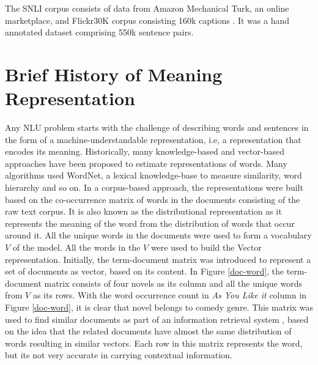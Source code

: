 \documentclass[12pt]{report} %
\begin{document}
  The SNLI corpus consists of data from Amazon Mechanical Turk, an online marketplace, and Flickr30K corpus consisting 160k captions \citep{bowman2015large}. It was a hand annotated dataset comprising 550k sentence pairs.

\section{Brief History of Meaning Representation}
\label{history}

Any NLU problem starts with the challenge of describing words and sentences in the form of a machine-understandable representation, i.e, a representation that encodes its meaning. Historically, many knowledge-based and vector-based approaches have been proposed to estimate representations of words. Many algorithms used WordNet, a lexical knowledge-base to measure similarity, word hierarchy and so on. In a corpus-based approach, the representations were built based on the co-occurrence matrix of words in the documents consisting of the raw text corpus. It is also known as the distributional representation as it represents the meaning of the word from the distribution of words that occur around it. All the unique words in the documents were used to form a vocabulary $V$ of the model. All the words in the $V$ were used to build the Vector representation. Initially, the term-document matrix was introduced to represent a set of documents as vector, based on its content. In Figure \ref{doc-word}, the term-document matrix consists of four novels as its column and all the unique words from $V$ as its rows. With the word occurrence count in \textit{As You Like it} column in Figure \ref{doc-word}, it is clear that novel belongs to comedy genre.  This matrix was used to find similar documents as part of an information retrieval system \citep{salton1971smart}, based on the idea that the related documents have almost the same distribution of words resulting in similar vectors.  Each row in this matrix represents the word, but its not very accurate in carrying contextual information. 
\end{document}
